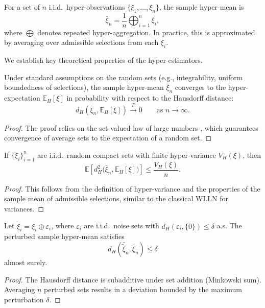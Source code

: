 \documentclass[twoside]{article}
\begin{document}
\begin{dfn}
For a set of $n$ i.i.d.\ hyper-observations $\{\xi_1,\dots,\xi_n\}$, the sample hyper-mean is
\begin{equation}
\bar{\xi}_n = \frac{1}{n}\bigoplus_{i=1}^n \xi_i,
\end{equation}
where $\bigoplus$ denotes repeated hyper-aggregation. In practice, this is approximated by averaging over admissible selections from each $\xi_i$.
\end{dfn}

We establish key theoretical properties of the hyper-estimators.

\begin{thm}
Under standard assumptions on the random sets (e.g., integrability, uniform boundedness of selections), the sample hyper-mean $\bar{\xi}_n$ converges to the hyper-expectation $\mathbb{E}_H[\xi]$ in probability with respect to the Hausdorff distance:
\[
d_H(\bar{\xi}_n,\mathbb{E}_H[\xi]) \xrightarrow{P} 0 \qquad \text{as } n\to\infty.
\]
\end{thm}

\begin{proof}
The proof relies on the set-valued law of large numbers \cite{Artstein:1997}, which guarantees convergence of average sets to the expectation of a random set.
\end{proof}

\begin{thm}
If $\{\xi_i\}_{i=1}^n$ are i.i.d.\ random compact sets with finite hyper-variance $V_H(\xi)$, then
\[
\mathbb{E}\left[d_H^2\big(\bar{\xi}_n,\mathbb{E}_H[\xi]\big)\right] \le \frac{V_H(\xi)}{n}.
\]
\end{thm}

\begin{proof}
This follows from the definition of hyper-variance and the properties of the sample mean of admissible selections, similar to the classical WLLN for variances.
\end{proof}

\begin{thm}
Let $\tilde{\xi}_i = \xi_i \oplus \varepsilon_i$, where $\varepsilon_i$ are i.i.d.\ noise sets with $d_H(\varepsilon_i,\{0\})\le \delta$ a.s. The perturbed sample hyper-mean satisfies
\[
d_H\!\left(\bar{\tilde{\xi}}_n,\bar{\xi}_n\right)\le \delta
\]
almost surely.
\end{thm}

\begin{proof}
The Hausdorff distance is subadditive under set addition (Minkowski sum). Averaging $n$ perturbed sets results in a deviation bounded by the maximum perturbation $\delta$.
\end{proof}
\end{document}
